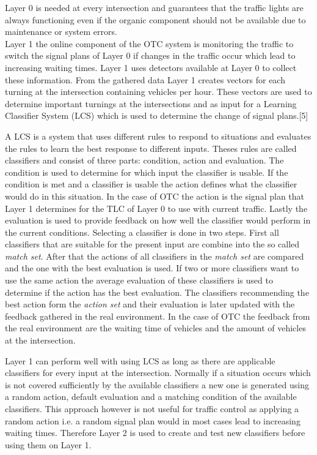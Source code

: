  Layer 0 is needed at every intersection and guarantees that the traffic lights are always functioning even if the organic component should not be available due to maintenance or system errors. \cite{organic1}\cite{organicLCS}\ \\
 
Layer 1
the online component of the OTC system is monitoring the traffic to switch the signal plans of Layer 0 if changes in the traffic occur which lead to increasing waiting times. Layer 1 uses detectors available at Layer 0 to collect these information. From the gathered data Layer 1 creates vectors for each turning at the intersection containing vehicles per hour. These vectors are used to determine important turnings at the intersections and as input for a Learning Classifier System (LCS) which is used to determine the change of signal plans.[5]

A LCS is a system that uses different rules to respond to situations and evaluates the rules to learn the best response to different inputs. Theses rules are called classifiers and consist of three parts: condition, action and evaluation. The condition is used to determine for which input the classifier is usable. If the condition is met and a classifier is usable the action defines what the classifier would do in this situation. In the case of OTC the action is the signal plan that Layer 1 determines for the TLC of Layer 0 to use with current traffic. Lastly the evaluation is used to provide feedback on how well the classifier would perform in the current conditions. Selecting a classifier is done in two steps. First all classifiers that are suitable for the present input are combine into the so called \textit{match set}. After that the actions of all classifiers in the \textit{match set} are compared and the one with the best evaluation is used. If two or more classifiers want to use the same action the average evaluation of these classifiers is used to determine if the action has the best evaluation. The classifiers recommending the best action form the \textit{action set} and their evaluation is later updated with the feedback gathered in the real environment. In the case of OTC the feedback from the real environment are the waiting time of vehicles and the amount of vehicles at the intersection.\cite{organic1}\cite{organicLCS}

Layer 1 can perform well with using LCS as long as there are applicable classifiers for every input at the intersection. Normally if a situation occurs which is not covered sufficiently by the available classifiers a new one is generated using a random action, default evaluation and a matching condition of the available classifiers. This approach however is not useful for traffic control as applying a random action i.e. a random signal plan would in most cases lead to increasing waiting times. Therefore Layer 2 is used to create and test new classifiers before using them on Layer 1. \cite{organic1}\cite{organicLCS}

